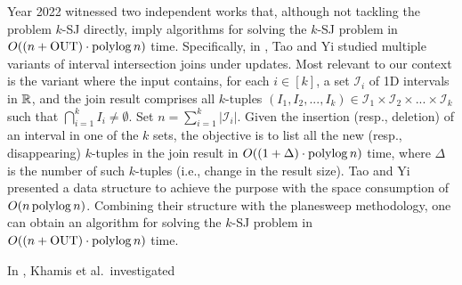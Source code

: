 \documentclass[sigconf]{acmart}
\def\vgap{\vspace{0mm}}
\def\I{\mathcal{I}}
\def\out{\mathrm{OUT}}
\begin{document}
\vgap

Year 2022 witnessed two independent works \cite{ty22,kcko22} that, although not tackling the problem $k$-SJ directly, imply algorithms for solving the $k$-SJ problem in $O((n + \out) \cdot \polylog n)$ time.  Specifically, in \cite{ty22}, Tao and Yi studied multiple variants of interval intersection joins under updates. Most relevant to our context is the variant where the input contains, for each $i \in [k]$, a set $\I_i$ of 1D intervals in $\mathbb{R}$, and the join result comprises all $k$-tuples $(I_1, I_2, ..., I_k) \in \I_1 \times \I_2 \times ... \times \I_k$ such that $\bigcap_{i=1}^k I_i \neq \emptyset$. Set $n = \sum_{i=1}^k |\I_i|$. Given the insertion (resp., deletion) of an interval in one of the $k$ sets, the objective is to list all the new (resp., disappearing) $k$-tuples in the join result in $O((1+\Delta) \cdot \operatorname*{polylog} n)$ time, where $\Delta$ is the number of such $k$-tuples (i.e., change in the result size). Tao and Yi \cite{ty22} presented a data structure to achieve the purpose with the space consumption of $O(n \operatorname*{polylog} n)$. Combining their structure with the planesweep methodology, one can obtain an algorithm for solving the $k$-SJ problem  in $O((n + \out) \cdot \polylog n)$ time.

\vgap

In \cite{kcko22}, Khamis et al.\ investigated



\balance

\end{document}
